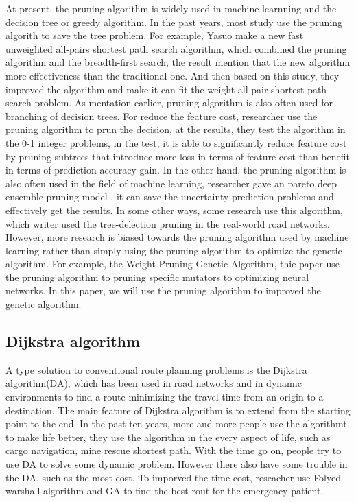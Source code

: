 \documentclass[12pt]{article}
\begin{document}
At present, the pruning algorithm is widely used in machine learnning and the decision tree or greedy algorithm. In the past years, most study use the pruning algorith to save the tree problem. For example, Yasuo\cite{Yamane2019} make a new
fast unweighted all-pairs shortest path search algorithm, which combined the pruning algorithm and the breadth-first search, the result mention that the new algorithm more effectiveness than the traditional one. And then based on this study, they improved the algorithm\cite{Yamane2019a} and make it can fit the weight all-pair shortest path search problem. As mentation earlier, pruning algorithm is also often used for branching of decision trees. For reduce the feature cost\cite{Nan2016}, researcher use the pruning algorithm to prun the decision, at the results, they test the algorithm in the 0-1 integer problems, in the test, it is able to significantly reduce feature cost by pruning subtrees that introduce more loss in terms of feature cost than benefit in terms of prediction accuracy gain.  In the other hand, the pruning algorithm is also often used in the field of machine learning, researcher gave an pareto deep ensemble pruning model\cite{Hu2019} , it can save the uncertainty prediction problems and effectively get the results.  
In some other ways, some research use this algorithm\cite{10.1007/978-3-642-28493-9_10}, which writer used the tree-delection pruning in the real-world road networks. However, more research is biased towards the pruning algorithm used by machine learning rather than simply using the pruning algorithm to optimize the genetic algorithm. For example, the Weight Pruning Genetic Algorithm\cite{Janjic2019}, thie paper use the pruning algorithm to pruning specific mutators to optimizing neural networks. In this paper, we will use the pruning algorithm to improved the genetic algorithm.



\subsection{Dijkstra algorithm}

A type solution to conventional route planning problems is the Dijkstra algorithm(DA), which has been used in road networks and in dynamic environments to find a route minimizing the travel time from an origin to a destination. The main feature of Dijkstra algorithm is to extend from the starting point to the end. In the past ten years, more and more people use the algorithmt to make life better, they use the algorithm in the every aspect of life, such as cargo navigation, mine rescue shortest path. With the time go on, people try to use DA to solve some dynamic problem\cite{10.1007/978-3-319-60042-0_15}. However there also have some trouble in the DA, such as the most cost. To imporved the time cost, reseacher use Folyed-warshall algorithm and GA to find the best rout for the emergency patient\cite{Risald2017}. 
\end{document}
